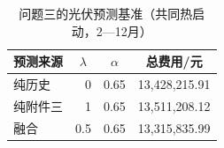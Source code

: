 \par
\begin{table}[!htbp]
\centering
\caption{问题三的光伏预测基准（共同热启动，2—12月）}\label{tab:q3-forecast}
\normalsize
\begin{tabular}{lrrr}
\toprule
\multicolumn{1}{c}{预测来源} & \multicolumn{1}{c}{$\lambda$} & \multicolumn{1}{c}{$\alpha$} & \multicolumn{1}{c}{总费用/元} \\
\midrule
纯历史 & 0 & 0.65 & 13,428,215.91 \\
纯附件三 & 1 & 0.65 & 13,511,208.12 \\
融合 & 0.5 & 0.65 & 13,315,835.99 \\
\bottomrule
\end{tabular}
\end{table}
\par
